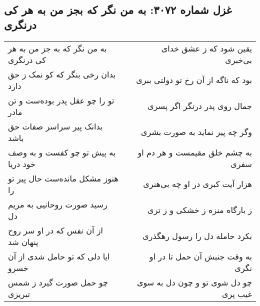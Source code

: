 \begin{center}
\section*{غزل شماره ۳۰۷۲: به من نگر که بجز من به هر کی درنگری}
\label{sec:3072}
\begin{longtable}{l p{0.5cm} r}
به من نگر که به جز من به هر کی درنگری
&&
یقین شود که ز عشق خدای بی‌خبری
\\
بدان رخی بنگر که کو نمک ز حق دارد
&&
بود که ناگه از آن رخ تو دولتی ببری
\\
تو را چو عقل پدر بوده‌ست و تن مادر
&&
جمال روی پدر درنگر اگر پسری
\\
بدانک پیر سراسر صفات حق باشد
&&
وگر چه پیر نماید به صورت بشری
\\
به پیش تو چو کفست و به وصف خود دریا
&&
به چشم خلق مقیمست و هر دم او سفری
\\
هنوز مشکل مانده‌ست حال پیر تو را
&&
هزار آیت کبری در او چه بی‌هنری
\\
رسید صورت روحانیی به مریم دل
&&
ز بارگاه منزه ز خشکی و ز تری
\\
از آن نفس که در او سر روح پنهان شد
&&
بکرد حامله دل را رسول رهگذری
\\
ایا دلی که تو حامل شدی از آن خسرو
&&
به وقت جنبش آن حمل تا در او نگری
\\
چو حمل صورت گیرد ز شمس تبریزی
&&
چو دل شوی تو و چون دل به سوی غیب پری
\\
\end{longtable}
\end{center}
